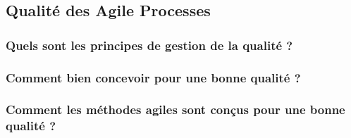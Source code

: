 \subsection{Qualité des Agile Processes}

\subsubsection{Quels sont les principes de gestion de la qualité ?}
\subsubsection{Comment bien concevoir pour une bonne qualité ?}
\subsubsection{Comment les méthodes agiles sont conçus pour une bonne qualité ?}